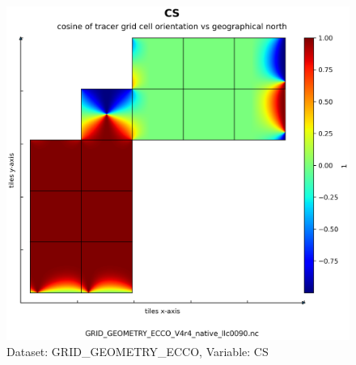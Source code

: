 \begin{figure}[H]
\centering
\includegraphics[scale=0.55]{../images/plots/native_plots_coords/Geometry_Parameters_for_the_Lat-Lon-Cap_90_(llc90)_Native_Model_Grid_(Version_4_Release_4)/CS.png}
\caption{Dataset: GRID\_GEOMETRY\_ECCO, Variable: CS}
\label{tab:table-GRID_GEOMETRY_ECCO_CS-Plot}
\end{figure}
\pagebreak
